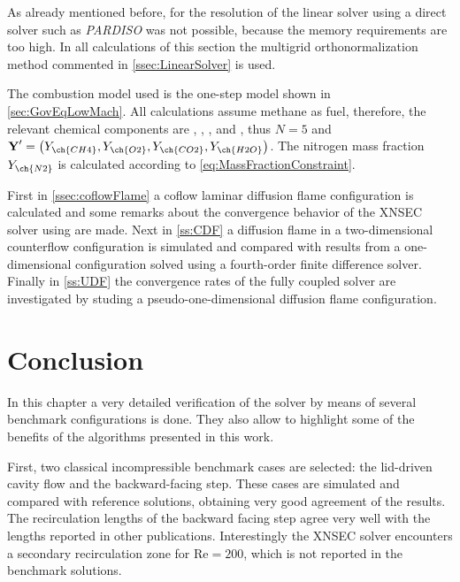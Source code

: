 As already mentioned before, for the resolution of the linear solver using a direct solver such as \textit{PARDISO} was not possible, because the memory requirements are too high. In all calculations of this section the multigrid orthonormalization method commented in \cref{ssec:LinearSolver} is used.

The combustion model used is the one-step model shown in \cref{sec:GovEqLowMach}. All calculations assume methane as fuel, therefore, the relevant chemical components are , , ,  and , thus $N = 5$ and $\vec{Y}' = \left(Y_{\ch{CH4}},Y_{\ch{O2}},Y_{\ch{CO2}},Y_{\ch{H2O}}\right)$. The nitrogen mass fraction $Y_{\ch{N2}}$ is calculated according to \cref{eq:MassFractionConstraint}.%

First in \cref{ssec:coflowFlame} a coflow laminar diffusion flame configuration is calculated and some remarks about the convergence behavior of the XNSEC solver using are made. Next in \cref{ss:CDF} a diffusion flame in a two-dimensional counterflow configuration is simulated and compared with results from a one-dimensional configuration solved using a fourth-order finite difference solver. Finally in \cref{ss:UDF} the convergence rates of the fully coupled solver are investigated by studing a pseudo-one-dimensional diffusion flame configuration.







\section{Conclusion}
In this chapter a very detailed verification of the solver by means of several benchmark configurations is done. They also allow to highlight some of the benefits of the algorithms presented in this work.

First, two classical incompressible benchmark cases are selected: the lid-driven cavity flow and the backward-facing step. These cases are simulated and compared with reference solutions, obtaining very good agreement of the results. The recirculation lengths of the backward facing step agree very well with the lengths reported in other publications. Interestingly the XNSEC solver encounters a secondary recirculation zone for $\text{Re} = 200$, which is not reported in the benchmark solutions.

